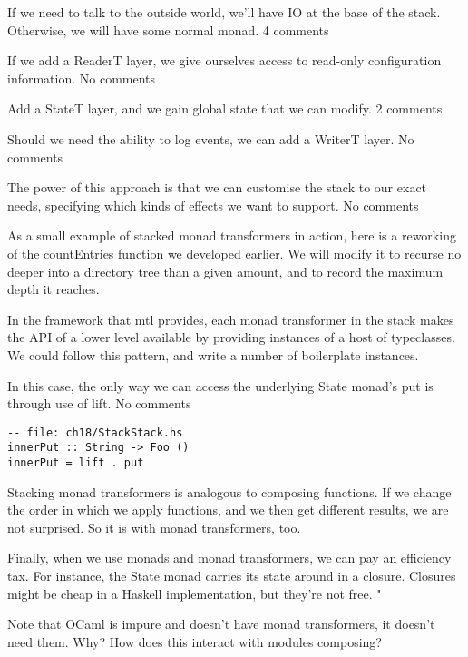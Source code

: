 If we need to talk to the outside world, we'll have IO at the base of the stack. Otherwise, we will have some normal monad. 4 comments

If we add a ReaderT layer, we give ourselves access to read-only configuration information. No comments

Add a StateT layer, and we gain global state that we can modify. 2 comments

Should we need the ability to log events, we can add a WriterT layer. No comments

The power of this approach is that we can customise the stack to our exact needs, specifying which kinds of effects we want to support. No comments

As a small example of stacked monad transformers in action, here is a reworking of the countEntries function we developed earlier. We will modify it to recurse no deeper into a directory tree than a given amount, and to record the maximum depth it reaches.

In the framework that mtl provides, each monad transformer in the stack makes the API of a lower level available by providing instances of a host of typeclasses. We could follow this pattern, and write a number of boilerplate instances.


In this case, the only way we can access the underlying State monad's put is through use of lift. No comments

\begin{verbatim}
-- file: ch18/StackStack.hs
innerPut :: String -> Foo ()
innerPut = lift . put
\end{verbatim}

Stacking monad transformers is analogous to composing functions. If we change the order in which we apply functions, and we then get different results, we are not surprised. So it is with monad transformers, too.

Finally, when we use monads and monad transformers, we can pay an efficiency tax. For instance, the State monad carries its state around in a closure. Closures might be cheap in a Haskell implementation, but they're not free.
"
\cite{o2008real}









Note that OCaml is impure and doesn't have monad transformers,
it doesn't need them.
Why?
How does this interact with modules composing?



